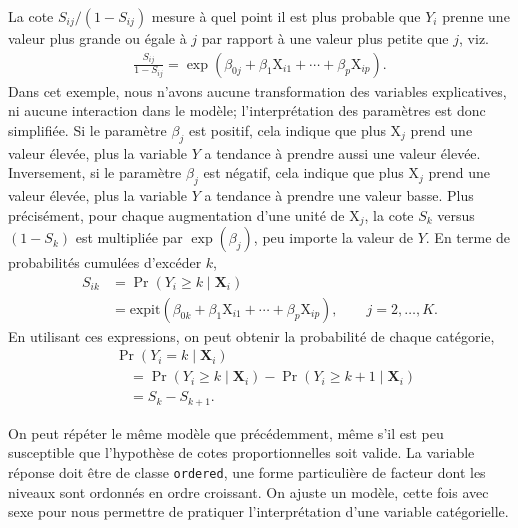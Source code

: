 \documentclass[
  11pt,
  letterpaper,
]{scrbook}
\theoremstyle{definition}
\theoremstyle{remark}
\begin{document}
La cote \(S_{ij}/(1-S_{ij})\) mesure à quel point il est plus probable
que \(Y_i\) prenne une valeur plus grande ou égale à \(j\) par rapport à
une valeur plus petite que \(j\), viz. \begin{align*}
\frac{S_{ij}}{1-S_{ij}} = \exp( \beta_{0j} + \beta_1\mathrm{X}_{i1} + \cdots + \beta_p \mathrm{X}_{ip}).
\end{align*} Dans cet exemple, nous n'avons aucune transformation des
variables explicatives, ni aucune interaction dans le modèle;
l'interprétation des paramètres est donc simplifiée. Si le paramètre
\(\beta_j\) est positif, cela indique que plus \(\mathrm{X}_j\) prend
une valeur élevée, plus la variable \(Y\) a tendance à prendre aussi une
valeur élevée. Inversement, si le paramètre \(\beta_j\) est négatif,
cela indique que plus \(\mathrm{X}_j\) prend une valeur élevée, plus la
variable \(Y\) a tendance à prendre une valeur basse. Plus précisément,
pour chaque augmentation d'une unité de \(\mathrm{X}_j\), la cote
\(S_k\) versus \((1-S_k)\) est multipliée par \(\exp(\beta_j)\), peu
importe la valeur de \(Y\). En terme de probabilités cumulées d'excéder
\(k\), \begin{align*}
S_{ik} &= \Pr(Y_i \geq k \mid \mathbf{X}_{i}) 
\\& = \textrm{expit}(\beta_{0k} + \beta_1 \mathrm{X}_{i1} + \cdots + \beta_p \mathrm{X}_{ip}), \qquad j =2, \ldots, K.
\end{align*} En utilisant ces expressions, on peut obtenir la
probabilité de chaque catégorie, \begin{align*}
&\Pr(Y_i = k \mid \mathbf{X}_{i}) \\&\quad=\Pr(Y_i \geq k \mid \mathbf{X}_{i}) -\Pr(Y_i \geq k+1 \mid \mathbf{X}_{i}) \\&\quad= S_{k} - S_{k+1}.
\end{align*}

On peut répéter le même modèle que précédemment, même s'il est peu
susceptible que l'hypothèse de cotes proportionnelles soit valide. La
variable réponse doit être de classe \texttt{ordered}, une forme
particulière de facteur dont les niveaux sont ordonnés en ordre
croissant. On ajuste un modèle, cette fois avec sexe pour nous permettre
de pratiquer l'interprétation d'une variable catégorielle.
\end{document}
